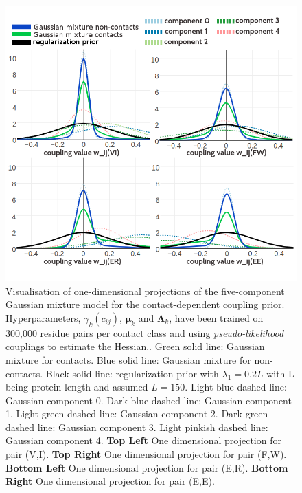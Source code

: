 \documentclass[11pt,a4paper,twoside]{book}
\newcommand{\eq}{\!=\!}
\newcommand{\Lk}{\mathbf{\Lambda}_k}
\newcommand{\muk}{\mathbf{\mu}_k}
\newcommand{\cij}{c_{ij}}
\theoremstyle{definition}
\theoremstyle{definition}
\theoremstyle{remark}
\begin{document}
\begin{figure}
\includegraphics[width=1\linewidth]{img/bayesian_model/pll/5/1dvis_combined_300k} \caption{Visualisation of one-dimensional
projections of the five-component Gaussian mixture model for the
contact-dependent coupling prior. Hyperparameters, \(\gamma_k(\cij)\),
\(\muk\) and \(\Lk\), have been trained on 300,000 residue pairs per
contact class and using \emph{pseudo-likelihood} couplings to estimate
the Hessian.. Green solid line: Gaussian mixture for contacts. Blue
solid line: Gaussian mixture for non-contacts. Black solid line:
regularization prior with \(\lambda_1 \eq 0.2L\) with L being protein
length and assumed \(L\eq150\). Light blue dashed line: Gaussian
component 0. Dark blue dashed line: Gaussian component 1. Light green
dashed line: Gaussian component 2. Dark green dashed line: Gaussian
component 3. Light pinkish dashed line: Gaussian component 4.
\textbf{Top Left} One dimensional projection for pair (V,I). \textbf{Top
Right} One dimensional projection for pair (F,W). \textbf{Bottom Left}
One dimensional projection for pair (E,R). \textbf{Bottom Right} One
dimensional projection for pair (E,E).}\label{fig:vis1d-pll-5comp-300k}
\end{figure}
\end{document}
